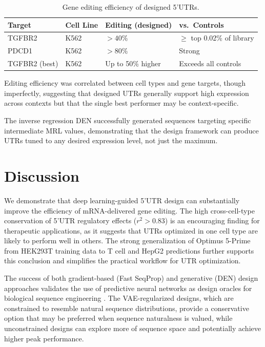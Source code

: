 \documentclass[12pt]{article}
\begin{document}
\begin{table}[ht]
\centering
\caption{Gene editing efficiency of designed 5'UTRs.}
\label{tab:editing}
\begin{tabular}{llll}
\toprule
Target & Cell Line & Editing (designed) & vs.\ Controls \\
\midrule
TGFBR2 & K562 & $> 40\%$ & $\geq$ top 0.02\% of library \\
PDCD1 & K562 & $> 80\%$ & Strong \\
TGFBR2 (best) & K562 & Up to 50\% higher & Exceeds all controls \\
\bottomrule
\end{tabular}
\end{table}

Editing efficiency was correlated between cell types and gene targets, though imperfectly, suggesting that designed UTRs generally support high expression across contexts but that the single best performer may be context-specific.

The inverse regression DEN successfully generated sequences targeting specific intermediate MRL values, demonstrating that the design framework can produce UTRs tuned to any desired expression level, not just the maximum.

\section{Discussion}

We demonstrate that deep learning-guided 5'UTR design can substantially improve the efficiency of mRNA-delivered gene editing. The high cross-cell-type conservation of 5'UTR regulatory effects ($r^2 > 0.83$) is an encouraging finding for therapeutic applications, as it suggests that UTRs optimized in one cell type are likely to perform well in others. The strong generalization of Optimus 5-Prime from HEK293T training data to T cell and HepG2 predictions further supports this conclusion and simplifies the practical workflow for UTR optimization.

The success of both gradient-based (Fast SeqProp) and generative (DEN) design approaches validates the use of predictive neural networks as design oracles for biological sequence engineering \citep{bogard2019deep, linder2020fast}. The VAE-regularized designs, which are constrained to resemble natural sequence distributions, provide a conservative option that may be preferred when sequence naturalness is valued, while unconstrained designs can explore more of sequence space and potentially achieve higher peak performance.
\end{document}
